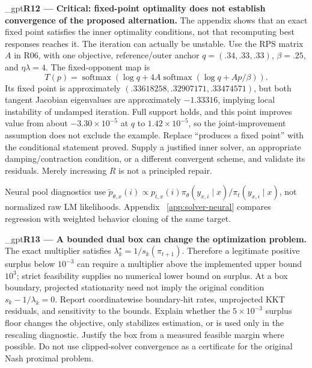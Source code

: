 \documentclass{article}
\makeatletter
\newif\ifshowreviews
\let\revieworiginalref\ref
\newcommand{\reviewref}[1]{%
  \@ifundefined{r@#1}{\textnormal{[original-draft ref.: \texttt{\detokenize{#1}}]}}%
  {\revieworiginalref{#1}}}
\let\ref\reviewref
\newcommand{\reviewresponse}[1]{%
  \ifshowreviews
  \par\begingroup\color{blue!65!black}\hypersetup{allcolors=blue!65!black}\emergencystretch=2em%
  \noindent\textbf{Response:} #1\par\endgroup
  \fi}
\theoremstyle{remark}
\theoremstyle{plain}
\makeatother
\begin{document}
\kekim_gpt{\textbf{R12 --- Critical: fixed-point optimality does not establish convergence of the proposed alternation.} The appendix shows that an exact fixed point satisfies the inner optimality conditions, not that recomputing best responses reaches it. The iteration can actually be unstable. Use the RPS matrix $A$ in R06, with one objective, reference/outer anchor $q=(.34,.33,.33)$, $\beta=.25$, and $\eta\lambda=4$. The fixed-opponent map is
\[
T(p)=\operatorname{softmax}\!\left(\log q+4A\operatorname{softmax}(\log q+Ap/\beta)\right).
\]
Its fixed point is approximately $(.33618258,.32907171,.33474571)$, but both tangent Jacobian eigenvalues are approximately $-1.33316$, implying local instability of undamped iteration. Full support holds, and this point improves value from about $-3.30\times10^{-5}$ at $q$ to $1.42\times10^{-5}$, so the joint-improvement assumption does not exclude the example. Replace ``produces a fixed point'' with the conditional statement proved. Supply a justified inner solver, an appropriate damping/contraction condition, or a different convergent scheme, and validate its residuals. Merely increasing $R$ is not a principled repair.}
\reviewresponse{\textbf{R12 --- Addressed.} The unconditional alternation claim is replaced by direct optimization of the strictly concave finite-pool objective. Appendix~\ref{app:direct-stability} includes the unstable fixed-point example, its approximately $-1.333163$ tangent eigenvalues, the objective's gradient/Hessian, and explicit numerical-residual requirements.}

Neural pool diagnostics use $\widetilde p_{\theta,x}(i)\propto p_{t,x}(i)\pi_\theta(y_{x,i}\mid x)/\pi_t(y_{x,i}\mid x)$, not normalized raw LM likelihoods. Appendix~\ref{app:solver-neural} compares regression with weighted behavior cloning of the same target.


\kekim_gpt{\textbf{R13 --- A bounded dual box can change the optimization problem.} The exact multiplier satisfies $\lambda_k^\star=1/s_k(\pi_{t+1})$. Therefore a legitimate positive surplus below $10^{-3}$ can require a multiplier above the implemented upper bound $10^3$; strict feasibility supplies no numerical lower bound on surplus. At a box boundary, projected stationarity need not imply the original condition $s_k-1/\lambda_k=0$. Report coordinatewise boundary-hit rates, unprojected KKT residuals, and sensitivity to the bounds. Explain whether the $5\times10^{-3}$ surplus floor changes the objective, only stabilizes estimation, or is used only in the rescaling diagnostic. Justify the box from a measured feasible margin where possible. Do not use clipped-solver convergence as a certificate for the original Nash proximal problem.}
\reviewresponse{\textbf{R13 --- Partially addressed.} Projected box stationarity is distinguished from the original unprojected KKT condition. The added UF-4 reconstruction reports multipliers $7.30$--$11.04$, a $3.74\times10^{-14}$ dual residual, and a $1.88\times10^{-10}$ maximum inner stationarity spread. Bound-sensitivity and boundary-hit sweeps, and the historical surplus floor's role, still require verification.}
\end{document}

